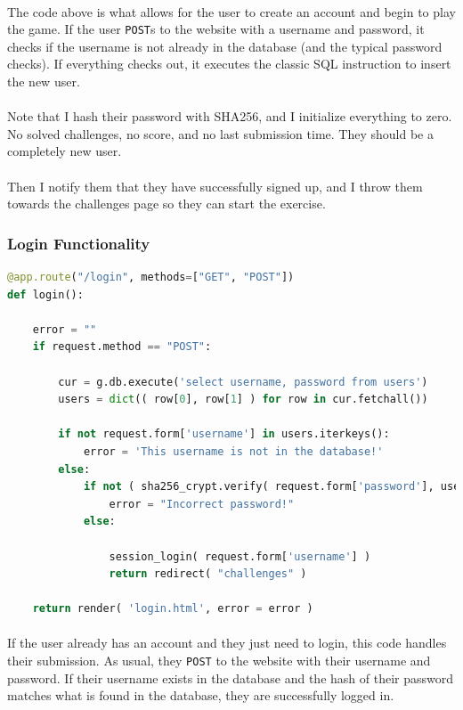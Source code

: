 \documentclass[11pt]{article}
\begin{document}
	\paragraph{} The code above is what allows for the user to create an account and begin to play the game. If the user \texttt{POST}s to the website with a username and password, it checks if the username is not already in the database (and the typical password checks). If everything checks out, it executes the classic SQL instruction to insert the new user.

	\paragraph{} Note that I hash their password with SHA256, and I initialize everything to zero. No solved challenges, no score, and no last submission time. They should be a completely new user.

	\paragraph{} Then I notify them that they have successfully signed up, and I throw them towards the challenges page so they can start the exercise.

	\subsubsection{Login Functionality}

	\begin{lstlisting}[language=Python]
@app.route("/login", methods=["GET", "POST"])
def login():

	error = ""
	if request.method == "POST":

		cur = g.db.execute('select username, password from users')
		users = dict(( row[0], row[1] ) for row in cur.fetchall())

		if not request.form['username'] in users.iterkeys():
			error = 'This username is not in the database!'
		else:
			if not ( sha256_crypt.verify( request.form['password'], users[request.form['username']] ) ):
				error = "Incorrect password!"
			else:
				
				session_login( request.form['username'] )
				return redirect( "challenges" )

	return render( 'login.html', error = error )
\end{lstlisting}

	\paragraph{} If the user already has an account and they just need to login, this code handles their submission. As usual, they \texttt{POST} to the website with their username and password. If their username exists in the database and the hash of their password matches what is found in the database, they are successfully logged in.
\end{document}
